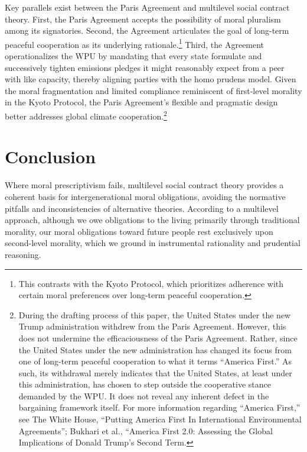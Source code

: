 Key parallels exist between the Paris Agreement and multilevel social contract theory. First, the Paris Agreement accepts the possibility of moral pluralism among its signatories. Second, the Agreement articulates the goal of long-term peaceful cooperation as its underlying rationale.\footnote{This contrasts with the Kyoto Protocol, which prioritizes adherence with certain moral preferences over long-term peaceful cooperation.} Third, the Agreement operationalizes the WPU by mandating that every state formulate and successively tighten emissions pledges it might reasonably expect from a peer with like capacity, thereby aligning parties with the homo prudens model. Given the moral fragmentation and limited compliance reminiscent of first-level morality in the Kyoto Protocol, the Paris Agreement’s flexible and pragmatic design better addresses global climate cooperation.\footnote{During the drafting process of this paper, the United States under the new Trump administration withdrew from the Paris Agreement. However, this does not undermine the efficaciousness of the Paris Agreement. Rather, since the United States under the new administration has changed its focus from one of long-term peaceful cooperation to what it terms “America First.” As such, its withdrawal merely indicates that the United States, at least under this administration, has chosen to step outside the cooperative stance demanded by the WPU. It does not reveal any inherent defect in the bargaining framework itself. For more information regarding “America First,” see The White House, “Putting America First In International Environmental Agreements”; Bukhari et al., “America First 2.0: Assessing the Global Implications of Donald Trump's Second Term.}

\section{Conclusion}

Where moral prescriptivism fails, multilevel social contract theory provides a coherent basis for intergenerational moral obligations, avoiding the normative pitfalls and inconsistencies of alternative theories. According to a multilevel approach, although we owe obligations to the living primarily through traditional morality, our moral obligations toward future people rest exclusively upon second-level morality, which we ground in instrumental rationality and prudential reasoning.
